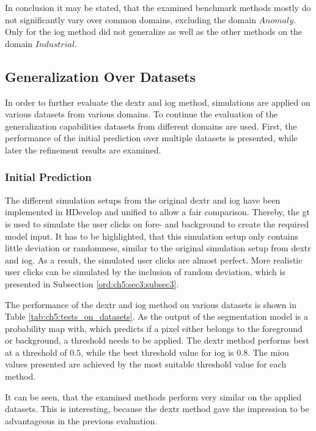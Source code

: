In conclusion it may be stated, that the examined benchmark methods mostly do not significantly vary over common domains, excluding the domain $ Anomaly $.
Only for the \gls{iog} method did not generalize as well as the other methods on the domain $ Industrial $.


\subsection{Generalization Over Datasets} \label{ord:ch5:sec2:subsec2}

In order to further evaluate the \gls{dextr} and \gls{iog} method, simulations are applied on various datasets from various domains.
To continue the evaluation of the generalization capabilities datasets from different domains are used.
First, the performance of the initial prediction over multiple datasets is presented, while later the refinement results are examined. 

\subsubsection{Initial Prediction}

The different simulation setups from the original \gls{dextr} \cite{Man18-DEXTR} and \gls{iog} \cite{Zha20-IOG} have been implemented in HDevelop and unified to allow a fair comparison. 
Thereby, the \gls{gt} is used to simulate the user clicks on fore- and background to create the required model input.
It has to be highlighted, that this simulation setup only contains little deviation or randomness, similar to the original simulation setup from \gls{dextr} and \gls{iog}.
As a result, the simulated user clicks are almost perfect.
More realistic user clicks can be simulated by the inclusion of random deviation, which is presented in Subsection \ref{ord:ch5:sec3:subsec3}.

The performance of the \gls{dextr} and \gls{iog} method on various datasets is shown in Table \ref{tab:ch5:tests_on_datasets}.
As the output of the segmentation model is a probability map with, which predicts if a pixel either belongs to the foreground or background, a threshold needs to be applied.
The \gls{dextr} method performs best at a threshold of $ 0.5 $, while the best threshold value for \gls{iog} is $ 0.8 $.
The \gls{miou} values presented are achieved by the most suitable threshold value for each method.

It can be seen, that the examined methods perform very similar on the applied datasets.
This is interesting, because the \gls{dextr} method gave the impression to be advantageous in the previous evaluation.

